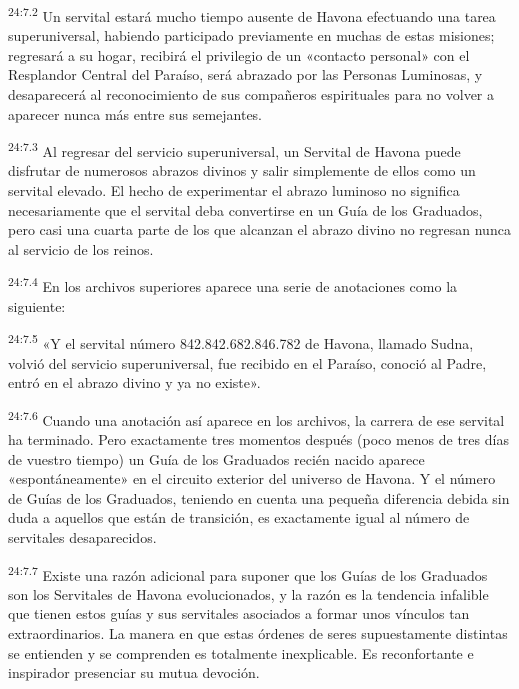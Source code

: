 \par
\textsuperscript{24:7.2} Un servital estará mucho tiempo ausente de Havona efectuando una tarea superuniversal, habiendo participado previamente en muchas de estas misiones; regresará a su hogar, recibirá el privilegio de un «contacto personal» con el Resplandor Central del Paraíso, será abrazado por las Personas Luminosas, y desaparecerá al reconocimiento de sus compañeros espirituales para no volver a aparecer nunca más entre sus semejantes.

\par
\textsuperscript{24:7.3} Al regresar del servicio superuniversal, un Servital de Havona puede disfrutar de numerosos abrazos divinos y salir simplemente de ellos como un servital elevado. El hecho de experimentar el abrazo luminoso no significa necesariamente que el servital deba convertirse en un Guía de los Graduados, pero casi una cuarta parte de los que alcanzan el abrazo divino no regresan nunca al servicio de los reinos.

\par
\textsuperscript{24:7.4} En los archivos superiores aparece una serie de anotaciones como la siguiente:

\par
\textsuperscript{24:7.5} «Y el servital número 842.842.682.846.782 de Havona, llamado Sudna, volvió del servicio superuniversal, fue recibido en el Paraíso, conoció al Padre, entró en el abrazo divino y ya no existe».

\par
\textsuperscript{24:7.6} Cuando una anotación así aparece en los archivos, la carrera de ese servital ha terminado. Pero exactamente tres momentos después (poco menos de tres días de vuestro tiempo) un Guía de los Graduados recién nacido aparece «espontáneamente» en el circuito exterior del universo de Havona. Y el número de Guías de los Graduados, teniendo en cuenta una pequeña diferencia debida sin duda a aquellos que están de transición, es exactamente igual al número de servitales desaparecidos.

\par
\textsuperscript{24:7.7} Existe una razón adicional para suponer que los Guías de los Graduados son los Servitales de Havona evolucionados, y la razón es la tendencia infalible que tienen estos guías y sus servitales asociados a formar unos vínculos tan extraordinarios. La manera en que estas órdenes de seres supuestamente distintas se entienden y se comprenden es totalmente inexplicable. Es reconfortante e inspirador presenciar su mutua devoción.

